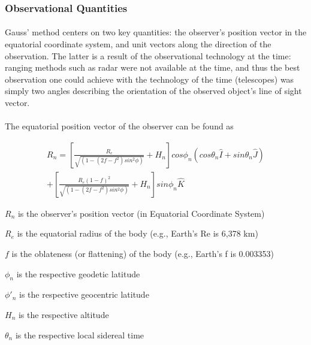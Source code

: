 \documentclass[11pt,twoside,letterpaper]{article}
\begin{document}
  \subsubsection {Observational Quantities}
  \paragraph{}
  Gauss' method centers on two key quantities: the observer's position
  vector in the equatorial coordinate system, and unit vectors along
  the direction of the observation. The latter is a result of the
  observational technology at the time: ranging methods such as radar
  were not available at the time, and thus the best observation one
  could achieve with the technology of the time (telescopes) was
  simply two angles describing the orientation of the observed
  object's line of sight vector. 

  \paragraph{}
  The equatorial position vector of the observer can be found as
  \cite{Wikipedia_2018}

  \begin{equation}
    \begin{split}
      R_n =
      \left[
        \frac{R_e}{\sqrt{(1 - (2f -f^2)sin^2\phi)}} + H_n
        \right]cos\phi_n(cos\theta_n\hat{I} + sin\theta_n\hat{J}) \\+
      \left[
        \frac{R_e(1 - f)^2}{\sqrt{(1 - (2f -f^2)sin^2\phi)}} + H_n
        \right]sin\phi_n\hat{K}
    \end{split}
  \end{equation}

  \(R_n\) is the observer's position vector (in Equatorial Coordinate System)
  
  \(R_e\) is the equatorial radius of the body (e.g., Earth's Re is 6,378 km)
  
  \(f\) is the oblateness (or flattening) of the body (e.g., Earth's f is 0.003353)
  
  \(\phi_n\) is the respective geodetic latitude
  
  \(\phi'_n\) is the respective geocentric latitude
  
  \(H_n\) is the respective altitude
  
  \(\theta_n\) is the respective local sidereal time

  \paragraph{}
  
\end{document}
